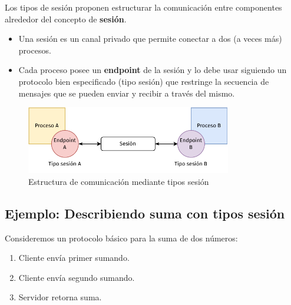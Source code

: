 \begin{frame}{\insertsection}
	Los tipos de sesión proponen estructurar la
	comunicación entre componentes alrededor del concepto de \textbf{sesión}.

	\begin{itemize}
		\item Una sesión es un canal privado que permite
			conectar a dos (a veces más) procesos.

		\item Cada proceso posee un \textbf{endpoint} de la sesión y lo
			debe usar siguiendo un protocolo bien especificado
			(tipo sesión) que restringe la secuencia de mensajes
			que se pueden enviar y recibir a través del mismo.
	\end{itemize}

	\begin{figure}
		\centering
		\includegraphics[width=0.8\textwidth]{images/tipo-sesion.pdf}
		\caption{Estructura de comunicación mediante tipos sesión}
	\end{figure}
\end{frame}

\subsection{Ejemplo: Describiendo suma con tipos sesión}

\begin{frame}{\insertsubsection}
	Consideremos un protocolo básico para la suma de dos números:
	\begin{enumerate}
		\item Cliente envía primer sumando.
		\item Cliente envía segundo sumando.
		\item Servidor retorna suma.
	\end{enumerate}
\end{frame}

